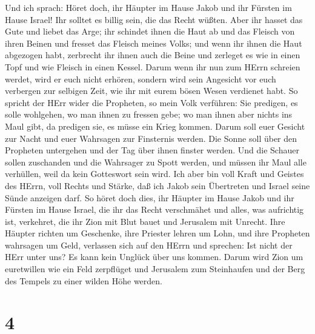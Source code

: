  Und ich sprach: Höret doch, ihr Häupter im Hause Jakob und
ihr Fürsten im Hause Israel! Ihr solltet es billig sein, die das Recht
wüßten.  Aber ihr hasset das Gute und liebet das Arge; ihr
schindet ihnen die Haut ab und das Fleisch von ihren Beinen 
und fresset das Fleisch meines Volks; und wenn ihr ihnen die Haut
abgezogen habt, zerbrecht ihr ihnen auch die Beine und zerleget es wie
in einen Topf und wie Fleisch in einen Kessel.  Darum wenn
ihr nun zum HErrn schreien werdet, wird er euch nicht erhören, sondern
wird sein Angesicht vor euch verbergen zur selbigen Zeit, wie ihr mit
eurem bösen Wesen verdienet habt.  So spricht der HErr wider
die Propheten, so mein Volk verführen: Sie predigen, es solle wohlgehen,
wo man ihnen zu fressen gebe; wo man ihnen aber nichts ins Maul gibt, da
predigen sie, es müsse ein Krieg kommen.  Darum soll euer
Gesicht zur Nacht und euer Wahrsagen zur Finsternis werden. Die Sonne
soll über den Propheten untergehen und der Tag über ihnen finster
werden.  Und die Schauer sollen zuschanden und die Wahrsager
zu Spott werden, und müssen ihr Maul alle verhüllen, weil da kein
Gotteswort sein wird.  Ich aber bin voll Kraft und Geistes
des HErrn, voll Rechts und Stärke, daß ich Jakob sein Übertreten und
Israel seine Sünde anzeigen darf.  So höret doch dies, ihr
Häupter im Hause Jakob und ihr Fürsten im Hause Israel, die ihr das
Recht verschmähet und alles, was aufrichtig ist, verkehret,
 die ihr Zion mit Blut bauet und Jerusalem mit Unrecht.
 Ihre Häupter richten um Geschenke, ihre Priester lehren um
Lohn, und ihre Propheten wahrsagen um Geld, verlassen sich auf den HErrn
und sprechen: Ist nicht der HErr unter uns? Es kann kein Unglück über
uns kommen.  Darum wird Zion um euretwillen wie ein Feld
zerpflüget und Jerusalem zum Steinhaufen und der Berg des Tempels zu
einer wilden Höhe werden.

\hypertarget{section-3}{%
\section{4}\label{section-3}}


